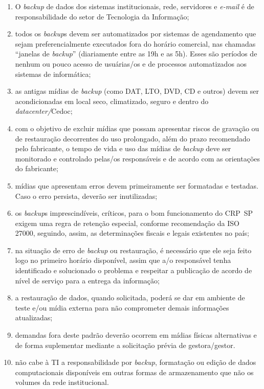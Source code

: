 \documentclass[openright, twoside, a4paper]{memoir}
\begin{document}
\begin{enumerate}

\item
    O \emph{backup} de dados dos sistemas institucionais, rede, servidores
    e \emph{e-mail} é de responsabilidade do setor de Tecnologia da
    Informação;
\item
    todos os \emph{backup}s devem ser automatizados por sistemas de
    agendamento que sejam preferencialmente executados fora do horário
    comercial, nas chamadas ``janelas de \emph{backup}'' (diariamente
    entre as 19h e as 5h). Esses são períodos de nenhum ou pouco acesso de
    usuárias/os e de processos automatizados aos sistemas de informática;
\item
    as antigas mídias de \emph{backup} (como DAT, LTO, DVD, CD e outros)
    devem ser acondicionadas em local seco, climatizado, seguro e dentro
    do \emph{datacenter/}Cedoc;
\item
    com o objetivo de excluir mídias que possam apresentar riscos de
    gravação ou de restauração decorrentes do uso prolongado, além do
    prazo recomendado pelo fabricante, o tempo de vida e uso das mídias de
    \emph{backup} deve ser monitorado e controlado pelas/os responsáveis e
    de acordo com as orientações do fabricante;
\item
    mídias que apresentam erros devem primeiramente ser formatadas e
    testadas. Caso o erro persista, deverão ser inutilizadas;
\item
    os \emph{backup}s imprescindíveis, críticos, para o bom funcionamento
    do CRP~SP exigem uma regra de retenção especial, conforme recomendação
    da ISO 27000, seguindo, assim, as determinações fiscais e legais
    existentes no país;
\item
    na situação de erro de \emph{backup} ou restauração, é necessário que
    ele seja feito logo no primeiro horário disponível, assim que a/o
    responsável tenha identificado e solucionado o problema e respeitar a
    publicação de acordo de nível de serviço para a entrega da informação;
\item
    a restauração de dados, quando solicitada, poderá se dar em ambiente
    de teste e/ou mídia externa para não comprometer demais informações
    atualizadas;
\item
    demandas fora deste padrão deverão ocorrem em mídias físicas
    alternativas e de forma suplementar mediante a solicitação prévia de
    gestora/gestor.
\item
    não cabe à TI a responsabilidade por \emph{backup}, formatação ou
    edição de dados computacionais disponíveis em outras formas de
    armazenamento que não os volumes da rede institucional.
\end{enumerate}
\end{document}
